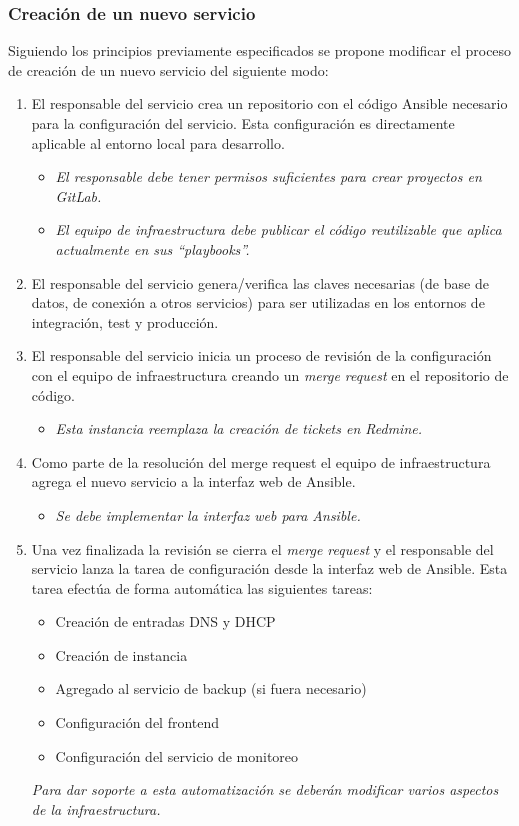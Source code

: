 \subsubsection{Creación de un nuevo servicio}

Siguiendo los principios previamente especificados se propone modificar el proceso de creación de un nuevo servicio del siguiente modo:

\begin{enumerate}
\item El responsable del servicio crea un repositorio con el código Ansible necesario para la configuración del servicio. Esta configuración es directamente aplicable al entorno local para desarrollo.
\begin{itemize}
\item \textit{El responsable debe tener permisos suficientes para crear proyectos en GitLab.}
\item \textit{El equipo de infraestructura debe publicar el código reutilizable que aplica actualmente en sus “playbooks”.}
\end{itemize}
\item El responsable del servicio genera/verifica las claves necesarias (de base de datos, de conexión a otros servicios) para ser utilizadas en los entornos de integración, test y producción.
\item El responsable del servicio inicia un proceso de revisión de la configuración con el equipo de infraestructura creando un \textit{merge request} en el repositorio de código.
\begin{itemize}
\item \textit{Esta instancia reemplaza la creación de tickets en Redmine.}
\end{itemize}
\item Como parte de la resolución del merge request el equipo de infraestructura agrega el nuevo servicio a la interfaz web de Ansible.
\begin{itemize}
\item \textit{Se debe implementar la interfaz web para Ansible.}
\end{itemize}
\item Una vez finalizada la revisión se cierra el \textit{merge request} y el responsable del servicio lanza la tarea de configuración desde la interfaz web de Ansible. Esta tarea efectúa de forma automática las siguientes tareas:
\begin{itemize}
\item Creación de entradas DNS y DHCP
\item Creación de instancia
\item Agregado al servicio de backup (si fuera necesario)
\item Configuración del frontend
\item Configuración del servicio de monitoreo
\end{itemize}
\textit{Para dar soporte a esta automatización se deberán modificar varios aspectos de la infraestructura.}
\end{enumerate}


